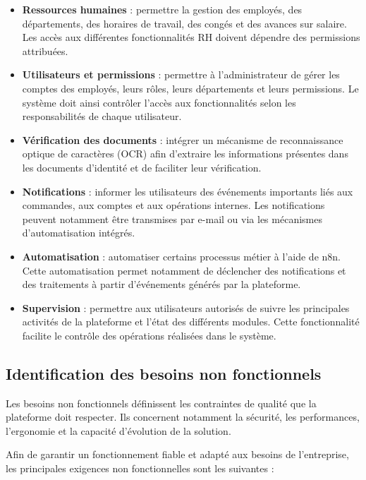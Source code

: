 \begin{itemize}
\item \textbf{Ressources humaines} : permettre la gestion des employés, des départements, des horaires de travail, des congés et des avances sur salaire. Les accès aux différentes fonctionnalités RH doivent dépendre des permissions attribuées.

\item \textbf{Utilisateurs et permissions} : permettre à l'administrateur de gérer les comptes des employés, leurs rôles, leurs départements et leurs permissions. Le système doit ainsi contrôler l'accès aux fonctionnalités selon les responsabilités de chaque utilisateur.

\item \textbf{Vérification des documents} : intégrer un mécanisme de reconnaissance optique de caractères (\ac{OCR}) afin d'extraire les informations présentes dans les documents d'identité et de faciliter leur vérification.

\item \textbf{Notifications} : informer les utilisateurs des événements importants liés aux commandes, aux comptes et aux opérations internes. Les notifications peuvent notamment être transmises par e-mail ou via les mécanismes d'automatisation intégrés.

\item \textbf{Automatisation} : automatiser certains processus métier à l'aide de n8n. Cette automatisation permet notamment de déclencher des notifications et des traitements à partir d'événements générés par la plateforme.

\item \textbf{Supervision} : permettre aux utilisateurs autorisés de suivre les principales activités de la plateforme et l'état des différents modules. Cette fonctionnalité facilite le contrôle des opérations réalisées dans le système.

\end{itemize}

\subsection{Identification des besoins non fonctionnels}

Les besoins non fonctionnels définissent les contraintes de qualité que la plateforme doit respecter. Ils concernent notamment la sécurité, les performances, l'ergonomie et la capacité d'évolution de la solution.

Afin de garantir un fonctionnement fiable et adapté aux besoins de l'entreprise, les principales exigences non fonctionnelles sont les suivantes :

